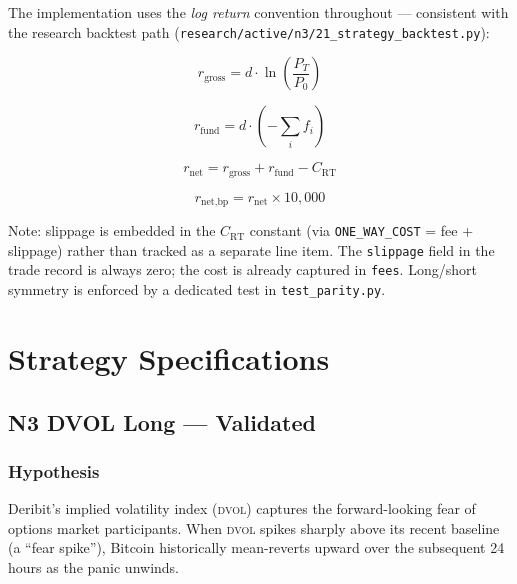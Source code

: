 \documentclass[12pt, a4paper]{article}
\theoremstyle{definition}
\newcommand{\DVOL}{\textsc{dvol}}
\begin{document}
The implementation uses the \emph{log return} convention throughout —
consistent with the research backtest path (\texttt{research/active/n3/21\_strategy\_backtest.py}):

\begin{equation}
    r_{\text{gross}} = d \cdot \ln\!\left(\frac{P_T}{P_0}\right)
    \label{eq:gross_return}
\end{equation}

\begin{equation}
    r_{\text{fund}} = d \cdot \left(-\sum_{i} f_i\right)
    \label{eq:funding_return}
\end{equation}

\begin{equation}
    r_{\text{net}} = r_{\text{gross}} + r_{\text{fund}} - C_{\text{RT}}
    \label{eq:net_return}
\end{equation}

\begin{equation}
    r_{\text{net,bp}} = r_{\text{net}} \times 10{,}000
    \label{eq:net_return_bp}
\end{equation}

Note: slippage is embedded in the $C_{\text{RT}}$ constant (via
\texttt{ONE\_WAY\_COST} = fee + slippage) rather than tracked as a
separate line item. The \texttt{slippage} field in the trade record is
always zero; the cost is already captured in \texttt{fees}.
Long/short symmetry is enforced by a dedicated test in
\texttt{test\_parity.py}.

\section{Strategy Specifications}

\subsection{N3 DVOL Long — Validated}

\subsubsection{Hypothesis}

Deribit's implied volatility index (\DVOL{}) captures the forward-looking
fear of options market participants. When \DVOL{} spikes sharply above its
recent baseline (a ``fear spike''), Bitcoin historically mean-reverts upward
over the subsequent 24 hours as the panic unwinds.
\end{document}

